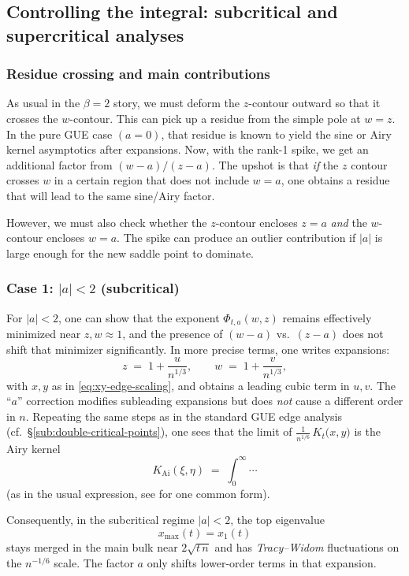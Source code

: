 \documentclass[letterpaper,11pt,oneside,reqno]{article}
\numberwithin{equation}{section}
\theoremstyle{definition}
\begin{document}
\subsection{Controlling the integral: subcritical and supercritical analyses}

\subsubsection{Residue crossing and main contributions}

As usual in the $\beta=2$ story, we must deform the $z$-contour outward so that it crosses the $w$-contour.  This can pick up a residue from the simple pole at $w=z$.  In the pure GUE case $(a=0)$, that residue is known to yield the sine or Airy kernel asymptotics after expansions.  Now, with the rank-1 spike, we get an additional factor from $(w-a)/(z-a)$.  The upshot is that \emph{if} the $z$ contour crosses $w$ in a certain region that does not include $w=a$, one obtains a residue that will lead to the same sine/Airy factor.  

However, we must also check whether the $z$-contour encloses $z=a$ \emph{and} the $w$-contour encloses $w=a$.  The spike can produce an outlier contribution if $|a|$ is large enough for the new saddle point to dominate.  

\subsubsection{Case 1: \texorpdfstring{$|a|<2$}{|a| < 2} (subcritical)}

For $\lvert a\rvert<2$, one can show that the exponent $\Phi_{t,a}(w,z)$ remains effectively minimized near $z,w\approx 1$, and the presence of $(w-a)$ vs.\ $(z-a)$ does not shift that minimizer significantly.  In more precise terms, one writes expansions:
\[
z \;=\; 1 + \frac{u}{n^{1/3}},
\qquad
w \;=\; 1 + \frac{v}{n^{1/3}},
\]
with $x,y$ as in \eqref{eq:xy-edge-scaling}, and obtains a leading cubic term in $u,v$.  The “$a$” correction modifies subleading expansions but does \emph{not} cause a different order in $n$.  Repeating the same steps as in the standard GUE edge analysis (cf.\ \S\ref{sub:double-critical-points}), one sees that the limit of $\frac{1}{n^{1/6}}\,K_t\bigl(x,y\bigr)$ is the Airy kernel
\[
K_{\mathrm{Ai}}(\xi,\eta)
\;=\;
\int_0^\infty \cdots
\]
(as in the usual expression, see  for one common form).

Consequently, in the subcritical regime $|a|<2$, the top eigenvalue 
\[
x_{\max}(t)= x_1(t)
\]
stays merged in the main bulk near $2\sqrt{t\,n}$ and has \emph{Tracy--Widom} fluctuations on the $n^{-1/6}$ scale.  The factor $a$ only shifts lower-order terms in that expansion.  
\end{document}

